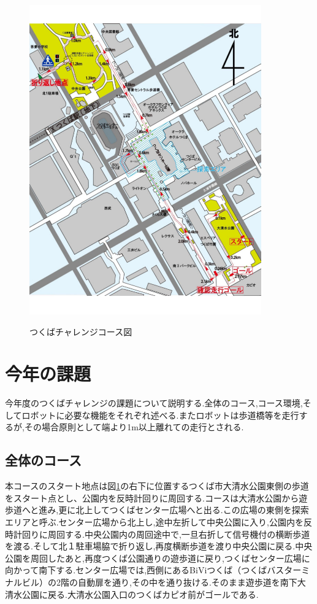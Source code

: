 \documentclass[12pt,oneside]{sotsuken_paper}
\begin{document}
\begin{figure}[htp]
 \begin{center}
  \includegraphics[width=100mm]{img/hard/tizu.jpg}
 　\caption{つくばチャレンジコース図}
  \label{fig:tizu}%
 \end{center}
\end{figure}

\section{今年の課題}
今年度のつくばチャレンジの課題について説明する.全体のコース,コース環境,そしてロボットに必要な機能をそれぞれ述べる.またロボットは歩道橋等を走行するが,その場合原則として端より1m以上離れての走行とされる.
\subsection{全体のコース}
本コースのスタート地点は図\ref{fig:tizu}の右下に位置するつくば市大清水公園東側の歩道をスタート点とし、公園内を反時計回りに周回する.コースは大清水公園から遊歩道へと進み,更に北上してつくばセンター広場へと出る.この広場の東側を探索エリアと呼ぶ.センター広場から北上し,途中左折して中央公園に入り,公園内を反時計回りに周回する.中央公園内の周回途中で,一旦右折して信号機付の横断歩道を渡る.そして北１駐車場脇で折り返し,再度横断歩道を渡り中央公園に戻る.中央公園を周回したあと,再度つくば公園通りの遊歩道に戻り,つくばセンター広場に向かって南下する.センター広場では,西側にあるBiViつくば（つくばバスターミナルビル）の2階の自動扉を通り,その中を通り抜ける.そのまま遊歩道を南下大清水公園に戻る.大清水公園入口のつくばカピオ前がゴールである.
\end{document}
